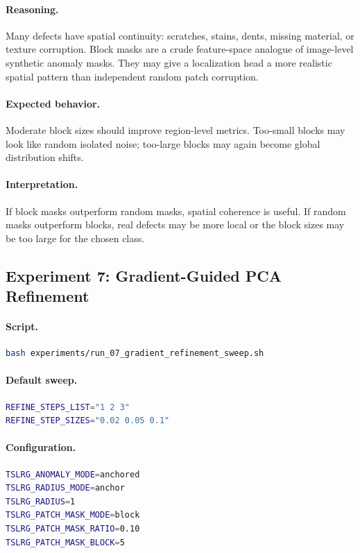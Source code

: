 \documentclass[11pt]{article}
\begin{document}
\paragraph{Reasoning.}
Many defects have spatial continuity: scratches, stains, dents, missing material,
or texture corruption. Block masks are a crude feature-space analogue of
image-level synthetic anomaly masks. They may give a localization head a more
realistic spatial pattern than independent random patch corruption.

\paragraph{Expected behavior.}
Moderate block sizes should improve region-level metrics. Too-small blocks may
look like random isolated noise; too-large blocks may again become global
distribution shifts.

\paragraph{Interpretation.}
If block masks outperform random masks, spatial coherence is useful. If random
masks outperform blocks, real defects may be more local or the block sizes may be
too large for the chosen class.

\subsection{Experiment 7: Gradient-Guided PCA Refinement}

\paragraph{Script.}
\begin{lstlisting}[language=bash]
bash experiments/run_07_gradient_refinement_sweep.sh
\end{lstlisting}

\paragraph{Default sweep.}
\begin{lstlisting}[language=bash]
REFINE_STEPS_LIST="1 2 3"
REFINE_STEP_SIZES="0.02 0.05 0.1"
\end{lstlisting}

\paragraph{Configuration.}
\begin{lstlisting}[language=bash]
TSLRG_ANOMALY_MODE=anchored
TSLRG_RADIUS_MODE=anchor
TSLRG_RADIUS=1
TSLRG_PATCH_MASK_MODE=block
TSLRG_PATCH_MASK_RATIO=0.10
TSLRG_PATCH_MASK_BLOCK=5
\end{lstlisting}
\end{document}
